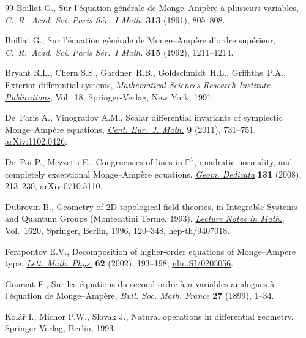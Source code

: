 \begin{thebibliography}{99}
Boillat G., Sur l'\'equation g\'en\'erale de {M}onge--{A}mp\`ere \`a plusieurs
 variables, \textit{C.~R.~Acad. Sci. Paris S\'er.~I Math.} \textbf{313}
 (1991), 805--808.

Boillat G., Sur l'\'equation g\'en\'erale de {M}onge--{A}mp\`ere d'ordre
 sup\'erieur, \textit{C.~R.~Acad. Sci. Paris S\'er.~I Math.} \textbf{315}
 (1992), 1211--1214.

Bryant R.L., Chern S.S., Gardner~R.B., Goldschmidt~H.L., Grif\/f\/iths~P.A.,
 Exterior dif\/ferential systems, \href{http://dx.doi.org/10.1007/978-1-4613-9714-4}{\textit{Mathematical Sciences Research
 Institute Publications}}, Vol.~18, Springer-Verlag, New York, 1991.

De~Paris A., Vinogradov A.M., Scalar dif\/ferential invariants of symplectic
 {M}onge--{A}mp\`ere equations, \href{http://dx.doi.org/10.2478/s11533-011-0046-7}{\textit{Cent. Eur.~J. Math.}} \textbf{9}
 (2011), 731--751, \href{http://arxiv.org/abs/1102.0426}{arXiv:1102.0426}.

De~Poi P., Mezzetti E., Congruences of lines in {${\mathbb P}^5$}, quadratic
 normality, and completely exceptional {M}onge--{A}mp\`ere equations,
 \href{http://dx.doi.org/10.1007/s10711-007-9228-7}{\textit{Geom. Dedicata}} \textbf{131} (2008), 213--230, \href{http://arxiv.org/abs/0710.5110}{arXiv:0710.5110}.

Dubrovin B., Geometry of {$2$}{D} topological f\/ield theories, in Integrable
 Systems and Quantum Groups ({M}ontecatini {T}erme, 1993), \href{http://dx.doi.org/10.1007/BFb0094793}{\textit{Lecture
 Notes in Math.}}, Vol.~1620, Springer, Berlin, 1996, 120--348,
 \href{http://arxiv.org/abs/hep-th/9407018}{hep-th/9407018}.

Ferapontov E.V., Decomposition of higher-order equations of {M}onge--{A}mp\`ere
 type, \href{http://dx.doi.org/10.1023/A:1022236709346}{\textit{Lett. Math. Phys.}} \textbf{62} (2002), 193--198,
 \href{http://arxiv.org/abs/nlin.SI/0205056}{nlin.SI/0205056}.

Goursat E., Sur les \'equations du second ordre \`a {$n$} variables analogues
 \`a l'\'equation de {M}onge--{A}mp\`ere, \textit{Bull. Soc. Math. France}
 \textbf{27} (1899), 1--34.

Kol{\'a}{\v{r}} I., Michor P.W., Slov{\'a}k J., Natural operations in
 dif\/ferential geometry, \href{http://dx.doi.org/10.1007/978-3-662-02950-3}{Springer-Verlag}, Berlin, 1993.


\end{thebibliography}

